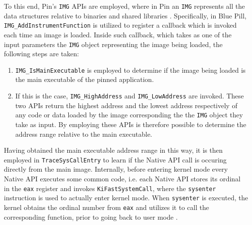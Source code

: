 \documentclass[binding=0.6cm,LaM,english,noexaminfo,oneside]{sapthesis} %
\begin{document}
To this end, Pin's \texttt{IMG} APIs are employed, where in Pin an \texttt{IMG} represents all the data structures relative to binaries and shared libraries \cite{Pin}. Specifically, in Blue Pill, \texttt{IMG\_AddInstrumentFunction} is utilized to register a callback which is invoked each time an image is loaded. Inside such callback, which takes as one of the input parameters the \texttt{IMG} object representing the image being loaded, the following steps are taken:
\begin{enumerate}
\item \texttt{IMG\_IsMainExecutable} is employed to determine if the image being loaded is the main executable of the pinned application.
\item If this is the case, \texttt{IMG\_HighAddress} and \texttt{IMG\_LowAddress} are invoked. These two APIs return the highest address and the lowest address respectively of any code or data loaded by the image corresponding the the \texttt{IMG} object they take as input. By employing these APIs is therefore possible to determine the address range relative to the main executable. 
\end{enumerate}  

Having obtained the main executable address range in this way, it is then employed in \texttt{TraceSysCallEntry} to learn if the Native API call is occuring directly from the main image. Internally, before entering kernel mode every Native API executes some common code, i.e. each Native API stores its ordinal in the \texttt{eax} register and invokes \texttt{KiFastSystemCall}, where the \texttt{sysenter} instruction is used to actually enter kernel mode. When \texttt{sysenter} is executed, the kernel obtains the ordinal number from \texttt{eax} and utilizes it to call the corresponding function, prior to going back to user mode \cite{MalwareTech}.
\end{document}
